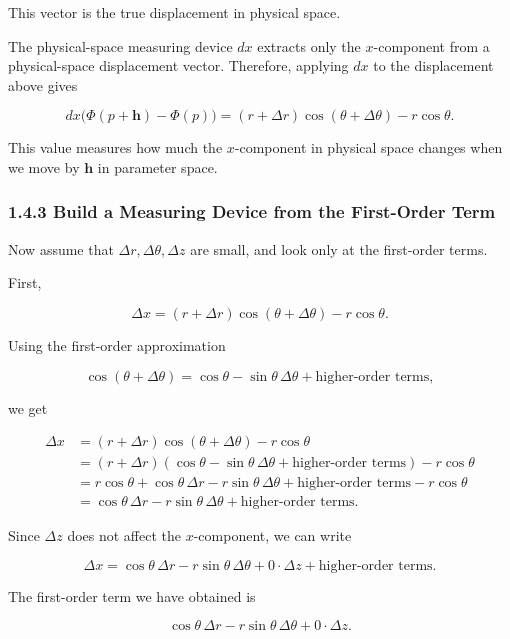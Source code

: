 This vector is the true displacement in physical space.

The physical-space measuring device \(dx\) extracts only the
\(x\)-component from a physical-space displacement vector. Therefore,
applying \(dx\) to the displacement above gives

\[
dx\bigl(\Phi(p+\mathbf h)-\Phi(p)\bigr)
=
(r+\Delta r)\cos(\theta+\Delta\theta)-r\cos\theta.
\]

This value measures how much the \(x\)-component in physical space
changes when we move by \(\mathbf h\) in parameter space.

\hypertarget{build-a-measuring-device-from-the-first-order-term}{%
\subsubsection{1.4.3 Build a Measuring Device from the First-Order
Term}\label{build-a-measuring-device-from-the-first-order-term}}

Now assume that \(\Delta r,\Delta\theta,\Delta z\) are small, and look
only at the first-order terms.

First,

\[
\Delta x
=
(r+\Delta r)\cos(\theta+\Delta\theta)-r\cos\theta.
\]

Using the first-order approximation

\[
\cos(\theta+\Delta\theta)
=
\cos\theta-\sin\theta\,\Delta\theta
+
\text{higher-order terms},
\]

we get

\[
\begin{aligned}
\Delta x
&=
(r+\Delta r)\cos(\theta+\Delta\theta)-r\cos\theta\\
&=
(r+\Delta r)(\cos\theta-\sin\theta\,\Delta\theta+\text{higher-order terms})-r\cos\theta\\
&=
r\cos\theta
+\cos\theta\,\Delta r
-r\sin\theta\,\Delta\theta
+\text{higher-order terms}
-r\cos\theta\\
&=
\cos\theta\,\Delta r
-r\sin\theta\,\Delta\theta
+\text{higher-order terms}.
\end{aligned}
\]

Since \(\Delta z\) does not affect the \(x\)-component, we can write

\[
\Delta x
=
\cos\theta\,\Delta r
-r\sin\theta\,\Delta\theta
+0\cdot\Delta z
+
\text{higher-order terms}.
\]

The first-order term we have obtained is

\[
\cos\theta\,\Delta r
-r\sin\theta\,\Delta\theta
+0\cdot\Delta z.
\]

